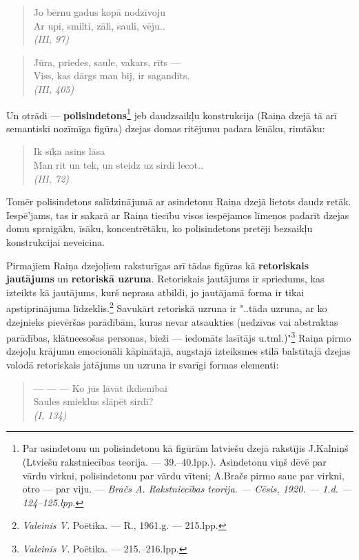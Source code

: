 \documentclass[11pt]{article}
\begin{document}
\begin{quote}
Jo bērnu gadus kopā nodzīvoju\\
Ar upi, smilti, zāli, sauli, vēju..\\
{\em (III, 97)}
\end{quote}

\begin{quote}
Jūra, priedes, saule, vakars, rīts ---\\
Viss, kas dārgs man bij, ir sagandīts.\\
{\em (III, 405)}
\end{quote}

Un otrādi --- {\bf polisindetons}\footnote{Par
asindetonu un polisindetonu kā figūrām latviešu
dzejā rakstījis J.Kalniņš (Ltviešu rakstniecības
teorija. --- 39.--40.lpp.). Asindetonu viņš
dēvē par vārdu virkni, polisindetonu par vārdu
vīteni; A.Bračs pirmo sauc par virkni, otro ---
par viju. --- {\em Bračs A. Rakstniecības
teorija. --- Cēsis, 1920. --- 1.d. --- 124--125.lpp.}}
jeb daudzsaikļu konstrukcija (Raiņa dzejā tā arī
semantiski nozīmīga figūra) dzejas domas ritējumu padara
lēnāku, rimtāku:

\begin{quote}
Ik sīķa asins lāsa\\
Man rit un tek, un steidz uz sirdi lecot..\\
{\em (III, 72)}
\end{quote}

Tomēr polisindetons salīdzinājumā ar asindetonu
Raiņa dzejā lietots daudz retāk. Iespē'jams, tas ir
sakarā ar Raiņa tiecību visos iespējamos līmeņos
padarīt dzejas domu spraigāku, īsāku, koncentrētāku,
ko polisindetons pretēji bezsaikļu konstrukcijai
neveicina.

Pirmajiem Raiņa dzejoļiem raksturīgas arī tādas
figūras kā {\bf retoriskais jautājums} un
{\bf retoriskā uzruna}. Retoriskais jautājums ir
spriedums, kas izteikts kā jautājums, kurš neprasa
atbildi, jo jautājamā forma ir tikai apstiprinājuma
līdzeklis.\footnote{{\em Valeinis V.} Poētika. ---
R., 1961.g. --- 215.lpp.} Savukārt retoriskā uzruna
ir "..tāda uzruna, ar ko dzejnieks pievēršas
parādībām, kuras nevar atsaukties (nedzīvas vai
abstraktas parādības, klātneesošas personas,
bieži --- iedomāts lasītājs u.tml.)"\footnote{{\em
Valeinis V.} Poētika. --- 215.--216.lpp.} Raiņa
pirmo dzejoļu krājumu emocionāli kāpinātajā, augstajā
izteiksmes stilā balstītajā dzejas valodā retoriskais
jatājums un uzruna ir svarīgi formas elementi:

\begin{quote}
--- --- --- Ko jūs ļāvāt ikdienībai\\
Saules smieklus slāpēt sirdī?\\
{\em (I, 134)}
\end{quote}
\end{document}
